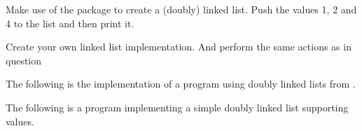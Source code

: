 \begin{Exercise}[title={Linked List},difficulty=1]
\label{ex:linkedlist}
\Question
\label{ex:linkedlist q1}
Make use of the package  to create
a (doubly) linked list. Push the values 1, 2 and 4 to the list and then
print it.

\Question
Create your own linked list implementation. And perform the same actions
as in question 
\end{Exercise}

\begin{Answer}
\Question The following is the implementation of a program using doubly
linked lists from .


\Question The following is a program implementing a simple doubly
linked list supporting  values.

\showremarks
\end{Answer}
